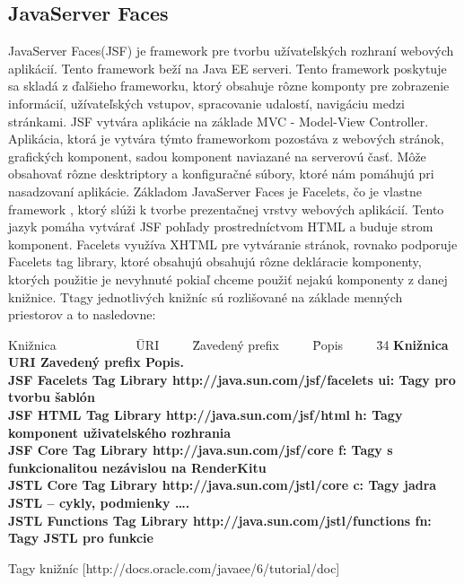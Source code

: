 \subsection{JavaServer Faces}
JavaServer Faces(JSF)  je framework pre tvorbu užívateľských rozhraní webových aplikácií. Tento framework beží na Java EE serveri. Tento framework poskytuje sa skladá z ďalšieho frameworku, ktorý obsahuje rôzne komponty pre zobrazenie informácií, užívateľských vstupov, spracovanie udalostí, navigáciu medzi stránkami. JSF vytvára aplikácie na základe MVC - Model-View Controller. Aplikácia, ktorá je vytvára týmto frameworkom pozostáva z webových stránok, grafických komponent, sadou komponent naviazané na serverovú časť. Môže obsahovať rôzne desktriptory a konfiguračné súbory, ktoré nám pomáhujú pri nasadzovaní aplikácie. Základom JavaServer Faces je Facelets, čo je vlastne framework , ktorý slúži k tvorbe prezentačnej vrstvy webových aplikácií. Tento jazyk pomáha vytvárať JSF pohľady prostredníctvom HTML a buduje strom komponent. Facelets využíva XHTML pre vytváranie stránok, rovnako podporuje Facelets tag library, ktoré obsahujú obsahujú rôzne dekláracie komponenty, ktorých použitie je nevyhnuté pokiaľ chceme použiť nejakú komponenty z danej knižnice. Ttagy jednotlivých knižníc sú rozlišované na základe menných priestorov a to nasledovne: 
 
\begin{table}

  \begin{tabbing}
    Knižnica ~~~~~~~~~~~~\= URI ~~~~ \= Zavedený prefix ~~~~ \= Popis ~~~~
    \= 34 \kill
    \bfseries Knižnica \>
    \bfseries URI \>
        \bfseries Zavedený prefix \>
    \bfseries Popis. \\[2mm]
   JSF Facelets Tag Library \> 	http://java.sun.com/jsf/facelets  \>	ui:  \>	Tagy pro tvorbu šablón \\
JSF HTML Tag Library  \>	http://java.sun.com/jsf/html  \>	h:  \>	Tagy komponent uživatelského rozhrania \\
JSF Core Tag Library  \>	http://java.sun.com/jsf/core  \>	f: 	 \> Tagy s funkcionalitou nezávislou na RenderKitu \\
JSTL Core Tag Library  \>	http://java.sun.com/jstl/core  \>	c:  \>	Tagy jadra JSTL – cykly, podmienky \ldots. \\
JSTL Functions Tag Library   \> http://java.sun.com/jstl/functions  \>	fn:  \>	Tagy JSTL pro funkcie  \\
    \end{tabbing}
\caption{Tagy knižníc [http://docs.oracle.com/javaee/6/tutorial/doc]}
\end{table}

